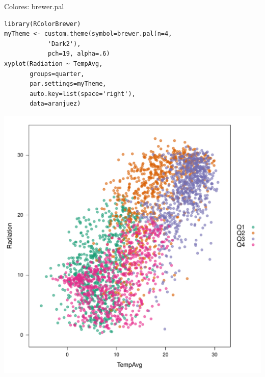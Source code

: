 \documentclass[xcolor={usenames,svgnames,dvipsnames}]{beamer}
\begin{document}
\begin{frame}[fragile,label=sec-2-1-14]{Colores: brewer.pal}
 \lstset{language=R,numbers=none}
\begin{lstlisting}
library(RColorBrewer)
myTheme <- custom.theme(symbol=brewer.pal(n=4,
			'Dark2'),
			pch=19, alpha=.6)
xyplot(Radiation ~ TempAvg,
       groups=quarter,
       par.settings=myTheme,
       auto.key=list(space='right'),
       data=aranjuez)
\end{lstlisting}

\includegraphics[width=.9\linewidth]{figs/brewer.pdf}
\end{frame}
\end{document}
